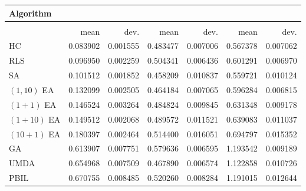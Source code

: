 \begin{tabular}{@{} l *{6}{>{{}}N{1}{2}} @{}}
\toprule
{Algorithm} &  \\
\midrule
&  &  &  \\
\midrule
& {mean} & {dev.} & {mean} & {dev.} & {mean} & {dev.} \\
\midrule
HC & 0.083902 & 0.001555 & 0.483477 & 0.007006 & 0.567378 & 0.007062 \\
RLS & 0.096950 & 0.002259 & 0.504341 & 0.006436 & 0.601291 & 0.006970 \\
SA & 0.101512 & 0.001852 & 0.458209 & 0.010837 & 0.559721 & 0.010124 \\
$(1,10)$ EA & 0.132099 & 0.002505 & 0.464184 & 0.007065 & 0.596284 & 0.006815 \\
$(1+1)$ EA & 0.146524 & 0.003264 & 0.484824 & 0.009845 & 0.631348 & 0.009178 \\
$(1+10)$ EA & 0.149512 & 0.002068 & 0.489572 & 0.011521 & 0.639083 & 0.011037 \\
$(10+1)$ EA & 0.180397 & 0.002464 & 0.514400 & 0.016051 & 0.694797 & 0.015352 \\
GA & 0.613907 & 0.007751 & 0.579636 & 0.006595 & 1.193542 & 0.009189 \\
UMDA & 0.654968 & 0.007509 & 0.467890 & 0.006574 & 1.122858 & 0.010726 \\
PBIL & 0.670755 & 0.008485 & 0.520260 & 0.008284 & 1.191015 & 0.012644 \\
\bottomrule
\end{tabular}
